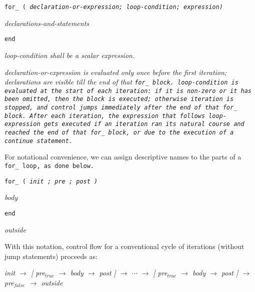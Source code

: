 
\tt{for_ (} \it{declaration-or-expression}\opt \tt{;}
\it{loop-condition}\opt \tt{;} \it{expression}\opt \tt{)}

\s\s\s\s\it{declarations-and-statements}\opt

\tt{end}


\it{loop-condition} shall be a scalar expression.


\it{declaration-or-expression} is evaluated only once before the first
iteration; declarations are visible till the end of that \tt{for_} block.
\it{loop-condition} is evaluated at the start of each iteration: if it is
non-zero or it has been omitted, then the block is executed; otherwise iteration
is stopped, and control jumps immediately after the end of that \tt{for_} block.
After each iteration, the \it{expression} that follows \it{loop-expression}
gets executed if an iteration ran its natural course and reached the end of
that \tt{for_} block, or due to the execution of a \tt{continue} statement.

\note For notational convenience, we can assign descriptive
names to the parts of a \tt{for_} loop, as done below.

\tt{for_ (} \it{init} \tt{;} \it{pre} \tt{;} \it{post} \tt{)}

\s\s\s\s\it{body}

\tt{end}

\it{outside}

With this notation, control flow for a conventional cycle
of iterations (without jump statements) proceeds as:
\begin{center}
\it{init}
$\to$
[ \it{pre}$_{true}$ $\to$ \it{body} $\to$ \it{post} ]\opt
$\to$
$\cdots$
$\to$
[ \it{pre}$_{true}$ $\to$ \it{body} $\to$ \it{post} ]\opt
$\to$
\it{pre}$_{false}$
$\to$
\it{outside}
\end{center}
